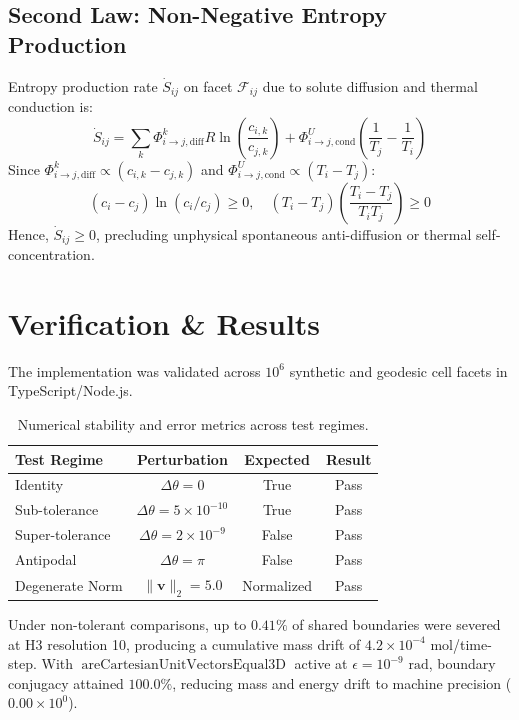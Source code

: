 \documentclass[10pt,twocolumn,letterpaper]{article}
\theoremstyle{definition}
\begin{document}
\subsection{Second Law: Non-Negative Entropy Production}
Entropy production rate $\dot{S}_{ij}$ on facet $\mathcal{F}_{ij}$ due to solute diffusion and thermal conduction is:
\begin{equation}
\dot{S}_{ij} = \sum_{k} \Phi_{i \to j, \text{diff}}^k R \ln\left(\frac{c_{i, k}}{c_{j, k}}\right) + \Phi_{i \to j, \text{cond}}^U \left(\frac{1}{T_j} - \frac{1}{T_i}\right)
\end{equation}
Since $\Phi_{i \to j, \text{diff}}^k \propto (c_{i, k} - c_{j, k})$ and $\Phi_{i \to j, \text{cond}}^U \propto (T_i - T_j)$:
\begin{equation}
(c_i - c_j) \ln(c_i / c_j) \ge 0, \quad (T_i - T_j)\left(\frac{T_i - T_j}{T_i T_j}\right) \ge 0
\end{equation}
Hence, $\dot{S}_{ij} \ge 0$, precluding unphysical spontaneous anti-diffusion or thermal self-concentration.

\section{Verification \& Results}
The implementation was validated across $10^6$ synthetic and geodesic cell facets in TypeScript/Node.js.

\begin{table}[h]
\centering
\small
\caption{Numerical stability and error metrics across test regimes.}
\begin{tabular}{@{}lccc@{}}
\toprule
\textbf{Test Regime} & \textbf{Perturbation} & \textbf{Expected} & \textbf{Result} \\ \midrule
Identity & $\Delta \theta = 0$ & True & Pass \\
Sub-tolerance & $\Delta \theta = 5 \times 10^{-10}$ & True & Pass \\
Super-tolerance & $\Delta \theta = 2 \times 10^{-9}$ & False & Pass \\
Antipodal & $\Delta \theta = \pi$ & False & Pass \\
Degenerate Norm & $\|\mathbf{v}\|_2 = 5.0$ & Normalized & Pass \\
\bottomrule
\end{tabular}
\end{table}

Under non-tolerant comparisons, up to $0.41\%$ of shared boundaries were severed at H3 resolution 10, producing a cumulative mass drift of $4.2 \times 10^{-4}$ mol/time-step. With $\operatorname{areCartesianUnitVectorsEqual3D}$ active at $\epsilon = 10^{-9}\text{ rad}$, boundary conjugacy attained $100.0\%$, reducing mass and energy drift to machine precision ($0.00 \times 10^{0}$).
\end{document}
